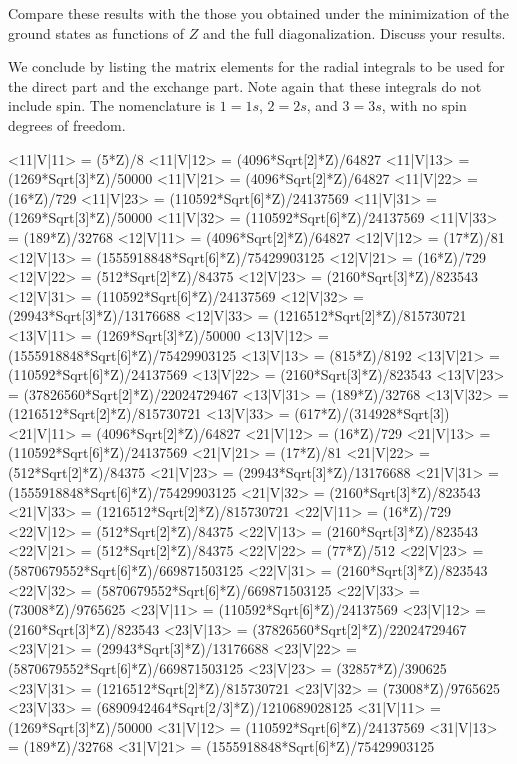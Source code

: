 \documentclass[%
oneside,                 %
final,                   %
10pt]{article}
\begin{document}
Compare these results with the those you obtained under the
minimization of the ground states as functions of $Z$ and the full
diagonalization. Discuss your results.




We conclude by listing the matrix elements for the radial integrals to
be used for the direct part and the exchange part. Note again that
these integrals do not include spin. The nomenclature is $1=1s$,
$2=2s$, and $3=3s$, with no spin degrees of freedom.

\bccq
<11|V|11> = (5*Z)/8
<11|V|12> = (4096*Sqrt[2]*Z)/64827
<11|V|13> = (1269*Sqrt[3]*Z)/50000
<11|V|21> = (4096*Sqrt[2]*Z)/64827
<11|V|22> = (16*Z)/729
<11|V|23> = (110592*Sqrt[6]*Z)/24137569
<11|V|31> = (1269*Sqrt[3]*Z)/50000
<11|V|32> = (110592*Sqrt[6]*Z)/24137569
<11|V|33> = (189*Z)/32768
<12|V|11> = (4096*Sqrt[2]*Z)/64827
<12|V|12> = (17*Z)/81
<12|V|13> = (1555918848*Sqrt[6]*Z)/75429903125
<12|V|21> = (16*Z)/729
<12|V|22> = (512*Sqrt[2]*Z)/84375
<12|V|23> = (2160*Sqrt[3]*Z)/823543
<12|V|31> = (110592*Sqrt[6]*Z)/24137569
<12|V|32> = (29943*Sqrt[3]*Z)/13176688
<12|V|33> = (1216512*Sqrt[2]*Z)/815730721
<13|V|11> = (1269*Sqrt[3]*Z)/50000
<13|V|12> = (1555918848*Sqrt[6]*Z)/75429903125
<13|V|13> = (815*Z)/8192
<13|V|21> = (110592*Sqrt[6]*Z)/24137569
<13|V|22> = (2160*Sqrt[3]*Z)/823543
<13|V|23> = (37826560*Sqrt[2]*Z)/22024729467
<13|V|31> = (189*Z)/32768
<13|V|32> = (1216512*Sqrt[2]*Z)/815730721
<13|V|33> = (617*Z)/(314928*Sqrt[3])
<21|V|11> = (4096*Sqrt[2]*Z)/64827
<21|V|12> = (16*Z)/729
<21|V|13> = (110592*Sqrt[6]*Z)/24137569
<21|V|21> = (17*Z)/81
<21|V|22> = (512*Sqrt[2]*Z)/84375
<21|V|23> = (29943*Sqrt[3]*Z)/13176688
<21|V|31> = (1555918848*Sqrt[6]*Z)/75429903125
<21|V|32> = (2160*Sqrt[3]*Z)/823543
<21|V|33> = (1216512*Sqrt[2]*Z)/815730721
<22|V|11> = (16*Z)/729
<22|V|12> = (512*Sqrt[2]*Z)/84375
<22|V|13> = (2160*Sqrt[3]*Z)/823543
<22|V|21> = (512*Sqrt[2]*Z)/84375
<22|V|22> = (77*Z)/512
<22|V|23> = (5870679552*Sqrt[6]*Z)/669871503125
<22|V|31> = (2160*Sqrt[3]*Z)/823543
<22|V|32> = (5870679552*Sqrt[6]*Z)/669871503125
<22|V|33> = (73008*Z)/9765625
<23|V|11> = (110592*Sqrt[6]*Z)/24137569
<23|V|12> = (2160*Sqrt[3]*Z)/823543
<23|V|13> = (37826560*Sqrt[2]*Z)/22024729467
<23|V|21> = (29943*Sqrt[3]*Z)/13176688
<23|V|22> = (5870679552*Sqrt[6]*Z)/669871503125
<23|V|23> = (32857*Z)/390625
<23|V|31> = (1216512*Sqrt[2]*Z)/815730721
<23|V|32> = (73008*Z)/9765625
<23|V|33> = (6890942464*Sqrt[2/3]*Z)/1210689028125
<31|V|11> = (1269*Sqrt[3]*Z)/50000
<31|V|12> = (110592*Sqrt[6]*Z)/24137569
<31|V|13> = (189*Z)/32768
<31|V|21> = (1555918848*Sqrt[6]*Z)/75429903125
\end{document}
